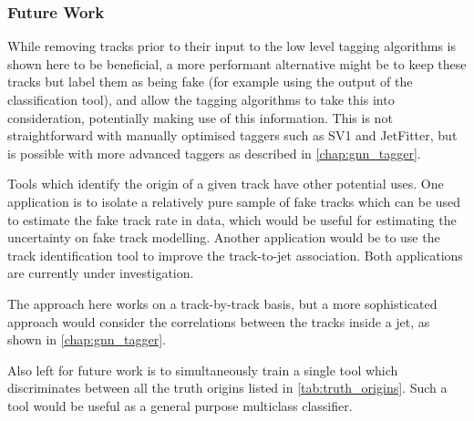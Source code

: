 \subsubsection{Future Work}
While removing tracks prior to their input to the low level tagging algorithms is shown here to be beneficial, a more performant alternative might be to keep these tracks but label them as being fake (for example using the output of the classification tool), and allow the tagging algorithms to take this into consideration, potentially making use of this information.
This is not straightforward with manually optimised taggers such as SV1 and JetFitter, but is possible with more advanced taggers as described in \cref{chap:gnn_tagger}.

Tools which identify the origin of a given track have other potential uses.
One application is to isolate a relatively pure sample of fake tracks which can be used to estimate the fake track rate in data, which would be useful for estimating the uncertainty on fake track modelling.
Another application would be to use the \bhadron track identification tool to improve the track-to-jet association.
Both applications are currently under investigation.

The approach here works on a track-by-track basis, but a more sophisticated approach would consider the correlations between the tracks inside a jet, as shown in \cref{chap:gnn_tagger}.

Also left for future work is to simultaneously train a single tool which discriminates between all the truth origins listed in \cref{tab:truth_origins}.
Such a tool would be useful as a general purpose multiclass classifier.